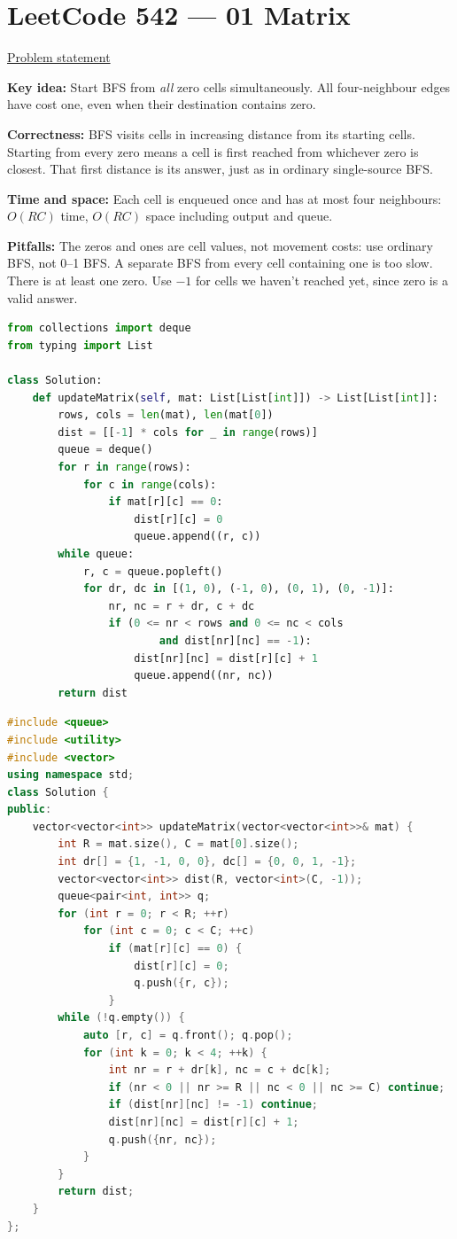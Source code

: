 \documentclass[11pt]{article}
\newcommand{\insight}[1]{\par\medskip\noindent\textbf{Key idea:} #1}
\newcommand{\correct}[1]{\par\textbf{Correctness:} #1}
\newcommand{\bounds}[1]{\par\textbf{Time and space:} #1}
\newcommand{\pitfalls}[1]{\par\textbf{Pitfalls:} #1}
\begin{document}
\section{LeetCode 542 --- 01 Matrix}
\href{https://leetcode.com/problems/01-matrix/}{Problem statement}
\insight{Start BFS from \emph{all} zero cells simultaneously. All four-neighbour edges have cost one, even when their destination contains zero.}
\correct{BFS visits cells in increasing distance from its starting cells. Starting from every zero means a cell is first reached from whichever zero is closest. That first distance is its answer, just as in ordinary single-source BFS.}
\bounds{Each cell is enqueued once and has at most four neighbours: $O(RC)$ time, $O(RC)$ space including output and queue.}
\pitfalls{The zeros and ones are cell values, not movement costs: use ordinary BFS, not 0--1 BFS. A separate BFS from every cell containing one is too slow. There is at least one zero. Use $-1$ for cells we haven't reached yet, since zero is a valid answer.}
\begin{lstlisting}[language=Python,caption={P07 --- Python 3},label={lst:p07-python}]
from collections import deque
from typing import List

class Solution:
    def updateMatrix(self, mat: List[List[int]]) -> List[List[int]]:
        rows, cols = len(mat), len(mat[0])
        dist = [[-1] * cols for _ in range(rows)]
        queue = deque()
        for r in range(rows):
            for c in range(cols):
                if mat[r][c] == 0:
                    dist[r][c] = 0
                    queue.append((r, c))
        while queue:
            r, c = queue.popleft()
            for dr, dc in [(1, 0), (-1, 0), (0, 1), (0, -1)]:
                nr, nc = r + dr, c + dc
                if (0 <= nr < rows and 0 <= nc < cols
                        and dist[nr][nc] == -1):
                    dist[nr][nc] = dist[r][c] + 1
                    queue.append((nr, nc))
        return dist
\end{lstlisting}
\begin{lstlisting}[language=C++,caption={P07 --- C++17},label={lst:p07-cpp}]
#include <queue>
#include <utility>
#include <vector>
using namespace std;
class Solution {
public:
    vector<vector<int>> updateMatrix(vector<vector<int>>& mat) {
        int R = mat.size(), C = mat[0].size();
        int dr[] = {1, -1, 0, 0}, dc[] = {0, 0, 1, -1};
        vector<vector<int>> dist(R, vector<int>(C, -1));
        queue<pair<int, int>> q;
        for (int r = 0; r < R; ++r)
            for (int c = 0; c < C; ++c)
                if (mat[r][c] == 0) {
                    dist[r][c] = 0;
                    q.push({r, c});
                }
        while (!q.empty()) {
            auto [r, c] = q.front(); q.pop();
            for (int k = 0; k < 4; ++k) {
                int nr = r + dr[k], nc = c + dc[k];
                if (nr < 0 || nr >= R || nc < 0 || nc >= C) continue;
                if (dist[nr][nc] != -1) continue;
                dist[nr][nc] = dist[r][c] + 1;
                q.push({nr, nc});
            }
        }
        return dist;
    }
};
\end{lstlisting}
\end{document}
